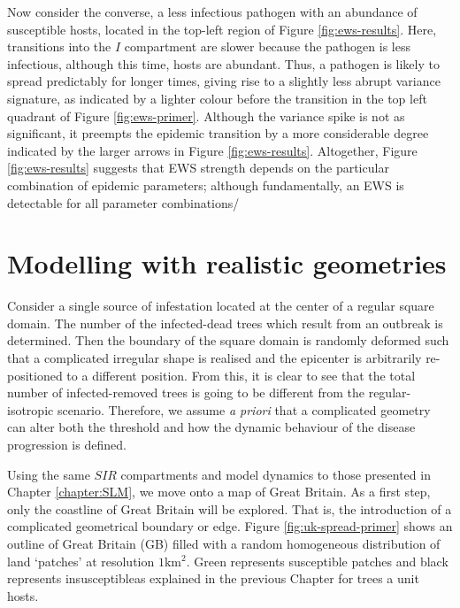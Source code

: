 Now consider the converse, a less infectious pathogen with an abundance of susceptible hosts, 
located in the top-left region of Figure \ref{fig:ews-results}.
Here, transitions into the $I$ compartment are slower because the pathogen is less infectious, 
although this time, hosts are abundant.
Thus, a pathogen is likely to spread predictably for longer times, 
giving rise to a slightly less abrupt variance signature, 
as indicated by a lighter colour before the transition in the top left quadrant of Figure \ref{fig:ews-primer}.
Although the variance spike is not as significant, 
it preempts the epidemic transition by a more considerable degree\textemdash
indicated by the larger arrows in Figure \ref{fig:ews-results}.
Altogether, Figure \ref{fig:ews-results} suggests that EWS strength depends on the particular combination of epidemic parameters; 
although fundamentally, an EWS is detectable for all parameter combinations/

\newpage


\section{Modelling with realistic geometries}


Consider a single source of infestation located at the center of a regular square domain. %
The number of the infected-dead trees which result from an outbreak is determined. %
Then the boundary of the square domain is randomly deformed such that a complicated irregular %
shape is realised and  the epicenter is arbitrarily re-positioned  to a different position. %
From this, it is clear to see that the total number of infected-removed trees is going to be different from the regular-isotropic scenario. %
Therefore, we assume \textit{a priori} that a complicated geometry can alter both the threshold and how the dynamic behaviour of the disease progression is defined. %

Using the same $SIR$ compartments and model dynamics to those presented in Chapter \ref{chapter:SLM}, %
we move onto a map of Great Britain. As a first step, only the coastline of Great Britain will be explored. %
That is, the introduction of a complicated geometrical boundary or edge. %
Figure \ref{fig:uk-spread-primer} shows an outline of Great Britain (GB) filled with a random homogeneous distribution of land `patches' at resolution $1\mathrm{km^2}$. %
Green represents susceptible patches and black represents insusceptible\textemdash as explained in the previous Chapter for trees a unit hosts. %

